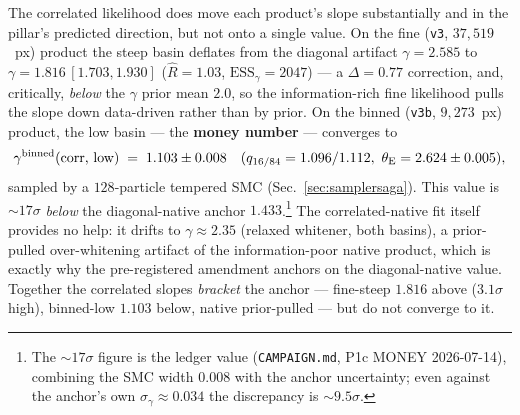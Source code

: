 \documentclass[11pt,letterpaper]{article}
\newcommand{\thetaE}{\ensuremath{\theta_{\mathrm{E}}}}
\newcommand{\gammaEPL}{\ensuremath{\gamma}}
\newcommand{\Rhat}{\ensuremath{\hat{R}}}
\newcommand{\ESS}{\textrm{ESS}}
\newcommand{\dfile}[1]{\texttt{#1}}
\begin{document}
The correlated likelihood does move each product's slope substantially and in
the pillar's predicted direction, but not onto a single value. On the fine
(\dfile{v3}, $37{,}519$~px) product the steep basin deflates from the diagonal
artifact $\gammaEPL=2.585$ to $\gammaEPL=1.816\,[1.703,1.930]$
($\Rhat=1.03$, $\ESS_\gamma=2047$) --- a $\Delta=0.77$ correction, and,
critically, {\it below} the $\gammaEPL$ prior mean $2.0$, so the
information-rich fine likelihood pulls the slope down data-driven rather than by
prior. On the binned (\dfile{v3b}, $9{,}273$~px) product, the low basin ---
the {\bf money number} --- converges to
\[
  \gammaEPL^{\rm binned}(\text{corr, low}) \;=\; 1.103\pm0.008
  \quad(q_{16/84}=1.096/1.112,\ \thetaE=2.624\pm0.005),
\]
sampled by a $128$-particle tempered SMC (Sec.~\ref{sec:samplersaga}). This
value is $\sim$$17\sigma$ {\it below} the diagonal-native anchor
$1.433$.\footnote{The $\sim$$17\sigma$ figure is the ledger value
(\texttt{CAMPAIGN.md}, P1c MONEY 2026-07-14), combining the SMC width
$0.008$ with the anchor uncertainty; even against the anchor's own
$\sigma_\gamma\approx0.034$ the discrepancy is $\sim$$9.5\sigma$.} The
correlated-native fit itself provides no help: it drifts to
$\gammaEPL\approx2.35$ (relaxed whitener, both basins), a prior-pulled
over-whitening artifact of the information-poor native product, which is exactly
why the pre-registered amendment anchors on the diagonal-native value.
Together the correlated slopes {\it bracket} the anchor --- fine-steep $1.816$
above ($3.1\sigma$ high), binned-low $1.103$ below, native prior-pulled --- but
do not converge to it.
\end{document}
